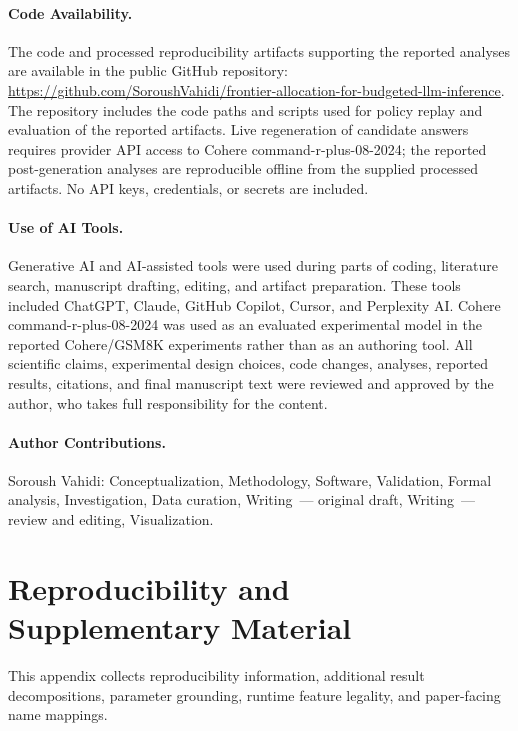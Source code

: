 \documentclass[smallcondensed]{svjour3}
\begin{document}
\paragraph{Code Availability.}
The code and processed reproducibility artifacts supporting the reported analyses
are available in the public GitHub repository:
\url{https://github.com/SoroushVahidi/frontier-allocation-for-budgeted-llm-inference}.
The repository includes the code paths and scripts used for policy replay and
evaluation of the reported artifacts. Live regeneration of candidate answers
requires provider API access to Cohere command-r-plus-08-2024; the reported
post-generation analyses are reproducible offline from the supplied processed
artifacts. No API keys, credentials, or secrets are included.

\paragraph{Use of AI Tools.}
Generative AI and AI-assisted tools were used during parts of coding, literature
search, manuscript drafting, editing, and artifact preparation. These tools
included ChatGPT, Claude, GitHub Copilot, Cursor, and Perplexity AI.
Cohere command-r-plus-08-2024 was used as an evaluated experimental model in the
reported Cohere/GSM8K experiments rather than as an authoring tool. All
scientific claims, experimental design choices, code changes, analyses,
reported results, citations, and final manuscript text were reviewed and
approved by the author, who takes full responsibility for the content.

\paragraph{Author Contributions.}
Soroush Vahidi: Conceptualization, Methodology, Software, Validation, Formal
analysis, Investigation, Data curation, Writing~--- original draft,
Writing~--- review and editing, Visualization.




\clearpage
\appendix
\section{Reproducibility and Supplementary Material}
\label{sec:appendix_repro}
This appendix collects reproducibility information, additional result decompositions,
parameter grounding, runtime feature legality, and paper-facing name mappings.
\end{document}
